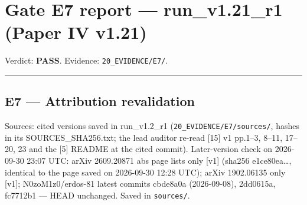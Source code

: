 \documentclass[
]{article}
\author{}
\date{}
\begin{document}
\section{Gate E7 report --- run\_v1.21\_r1 (Paper IV
v1.21)}\label{gate-e7-report--run_v121_r1-paper-iv-v121}

Verdict: \textbf{PASS}. Evidence: \texttt{20\_EVIDENCE/E7/}.

\begin{center}\rule{0.5\linewidth}{0.5pt}\end{center}

\subsection{E7 --- Attribution
revalidation}\label{e7--attribution-revalidation}

Sources: cited versions saved in run\_v1.2\_r1
(\texttt{20\_EVIDENCE/E7/sources/}, hashes in its SOURCES\_SHA256.txt;
the lead auditor re-read {[}15{]} v1 pp.1--3, 8--11, 17--20, 23 and the
{[}5{]} README at the cited commit). Later-version check on 2026-09-30
23:07 UTC: arXiv 2609.20871 abs page lists only {[}v1{]} (sha256
e1ce80ea\ldots, identical to the page saved on 2026-09-30 12:28 UTC);
arXiv 1902.06135 only {[}v1{]}; N0zoM1z0/erdos-81 latest commits
cbde8a0a (2026-09-08), 2dd0615a, fc7712b1 --- HEAD unchanged. Saved in
\texttt{sources/}.
\end{document}

